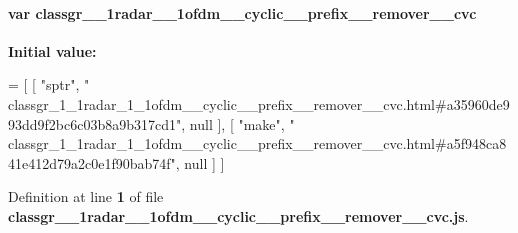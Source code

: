 \paragraph[{classgr\+\_\+1\+\_\+1radar\+\_\+1\+\_\+1ofdm\+\_\+\+\_\+cyclic\+\_\+\+\_\+prefix\+\_\+\+\_\+remover\+\_\+\+\_\+cvc}]{\setlength{\rightskip}{0pt plus 5cm}var classgr\+\_\+\_\+1radar\+\_\+\_\+1ofdm\+\_\+\+\_\+cyclic\+\_\+\+\_\+prefix\+\_\+\+\_\+remover\+\_\+\+\_\+cvc}\label{classgr__1__1radar__1__1ofdm____cyclic____prefix____remover____cvc_8js_a847319730c6e3bf941bf49511b4ce8e5}
{\bfseries Initial value\+:}
\begin{DoxyCode}
=
[
    [ \textcolor{stringliteral}{"sptr"}, \textcolor{stringliteral}{"
      classgr\_1\_1radar\_1\_1ofdm\_\_cyclic\_\_prefix\_\_remover\_\_cvc.html#a35960de993dd9f2bc6c03b8a9b317cd1"}, null ],
    [ \textcolor{stringliteral}{"make"}, \textcolor{stringliteral}{"
      classgr\_1\_1radar\_1\_1ofdm\_\_cyclic\_\_prefix\_\_remover\_\_cvc.html#a5f948ca841e412d79a2c0e1f90bab74f"}, null ]
]
\end{DoxyCode}


Definition at line {\bf 1} of file {\bf classgr\+\_\+\_\+1radar\+\_\+\_\+1ofdm\+\_\+\+\_\+cyclic\+\_\+\+\_\+prefix\+\_\+\+\_\+remover\+\_\+\+\_\+cvc.\+js}.

